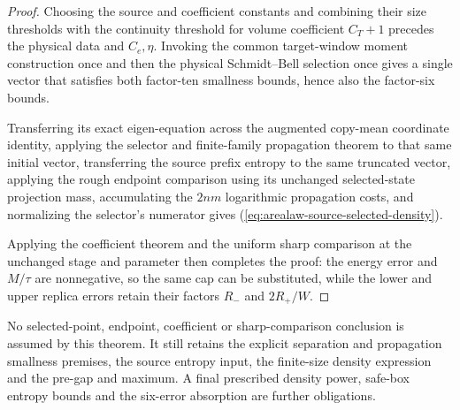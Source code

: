 \begin{proof}
    \leanok
    Choosing the source and coefficient constants and combining their size
    thresholds with the continuity threshold for volume coefficient
    $C_T+1$ precedes the physical data and $C_e,\eta$.
    Invoking the common target-window moment construction once and then the
    physical Schmidt--Bell selection once gives a single vector that satisfies
    both factor-ten smallness bounds, hence also the factor-six bounds.

    Transferring its exact eigen-equation across the augmented
    copy-mean coordinate identity, applying the selector and
    finite-family propagation theorem to that same initial vector,
    transferring the source prefix entropy to the same truncated vector,
    applying the rough endpoint comparison using its unchanged
    selected-state projection mass, accumulating the $2nm$ logarithmic
    propagation costs, and normalizing the selector's numerator
    gives (\ref{eq:arealaw-source-selected-density}).

    Applying the coefficient theorem and the uniform
    sharp comparison at the unchanged stage and parameter then completes the proof: the
    energy error and $M/\tau$ are nonnegative, so the same cap can be
    substituted, while the lower and upper replica errors retain their
    factors $R_-$ and $2R_+/W$.
\end{proof}

No selected-point, endpoint, coefficient or sharp-comparison conclusion is
assumed by this theorem. It still retains the explicit separation and
propagation smallness premises, the source entropy input, the finite-size
density expression and the pre-gap and maximum. A final prescribed
density power, safe-box entropy bounds and the six-error absorption are
further obligations.
